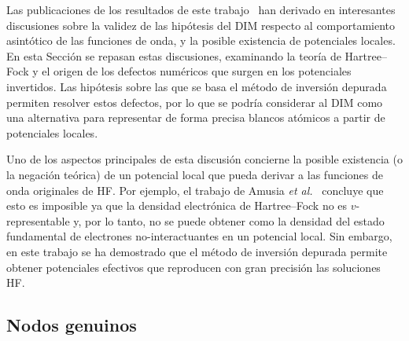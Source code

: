 Las publicaciones de los resultados de este trabajo~\cite{Mendez:16,
Mendez:19dim,Mendez:18,Mitnik:19} han derivado en interesantes 
discusiones sobre la validez de las hipótesis del DIM respecto al 
comportamiento asintótico de las funciones de onda, y la posible 
existencia de potenciales locales. En esta Sección se repasan estas 
discusiones, examinando la teoría de Hartree--Fock y el origen de los 
defectos numéricos que surgen en los potenciales invertidos. Las 
hipótesis sobre las que se basa el método de inversión depurada permiten 
resolver estos defectos, por lo que se podría considerar al DIM como una 
alternativa para representar de forma precisa blancos atómicos a partir 
de potenciales locales.


Uno de los aspectos principales de esta discusión concierne la posible 
existencia (o la negación teórica) de un potencial local que pueda 
derivar a las funciones de onda originales de HF. Por ejemplo, el 
trabajo de Amusia \textit{et al.}~\cite{Amusia:04} concluye que esto es 
imposible ya que la densidad electrónica de Hartree--Fock no es 
$v$-representable y, por lo tanto, no se puede obtener como la densidad 
del estado fundamental de electrones no-interactuantes en un potencial 
local. Sin embargo, en este trabajo se ha demostrado que el método de 
inversión depurada permite obtener potenciales efectivos que reproducen 
con gran precisión las soluciones HF.

\subsection{Nodos genuinos}
\label{subsec:nodosHF}

